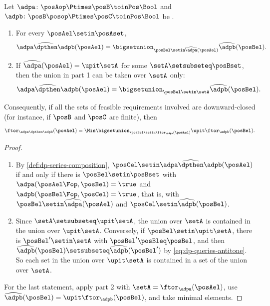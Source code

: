 \begin{proposition}
    \label{prop:dp-series-queries}
    Let $\adpa \colon \posAop \Ptimes \posB \toinPos \Bool$ and $\adpb \colon \posB\posop \Ptimes \posC \toinPos \Bool$ be .
    \begin{enumerate}
        \item For every $\posAel \setin \posAset$,
              \begin{equation}
                  \widehat{\adpa \dpthen \adpb}(\posAel) = \bigsetunion_{\posBel \setin \widehat{\adpa}(\posAel)} \widehat{\adpb}(\posBel).
              \end{equation}
        \item If $\widehat{\adpa}(\posAel) = \upit \setA$ for some $\setA \setsubseteq \posBset$, then the union in part 1 can be taken over $\setA$ only:
              \begin{equation}
                  \widehat{\adpa \dpthen \adpb}(\posAel) = \bigsetunion_{\posBel \setin \setA} \widehat{\adpb}(\posBel).
              \end{equation}
    \end{enumerate}
    Consequently, if all the sets of feasible requirements involved are downward-closed (for instance, if $\posB$ and $\posC$ are finite), then
    \begin{equation}
        \ftor_{\adpa \dpthen \adpb}(\posAel)
        = \Min \bigsetunion_{\posBel \setin \ftor_{\adpa}(\posAel)} \upit \ftor_{\adpb}(\posBel).
    \end{equation}
\end{proposition}
\begin{proof}
    \begin{enumerate}
        \item By \cref{def:dp-series-composition}, $\posCel \setin \widehat{\adpa \dpthen \adpb}(\posAel)$ if and only if there is $\posBel \setin \posBset$ with $\adpa(\posAel\Fop, \posBel) = \true$ and $\adpb(\posBel\Fop, \posCel) = \true$, that is, with $\posBel \setin \widehat{\adpa}(\posAel)$ and $\posCel \setin \widehat{\adpb}(\posBel)$.
        \item Since $\setA \setsubseteq \upit \setA$, the union over $\setA$ is contained in the union over $\upit \setA$.
              Conversely, if $\posBel \setin \upit \setA$, there is $\posBel' \setin \setA$ with $\posBel' \posBleq \posBel$, and then $\widehat{\adpb}(\posBel) \setsubseteq \widehat{\adpb}(\posBel')$ by \cref{eq:dp-queries-antitone}.
              So each set in the union over $\upit \setA$ is contained in a set of the union over $\setA$.
    \end{enumerate}
    For the last statement, apply part 2 with $\setA = \ftor_{\adpa}(\posAel)$, use $\widehat{\adpb}(\posBel) = \upit \ftor_{\adpb}(\posBel)$, and take minimal elements.
\end{proof}


